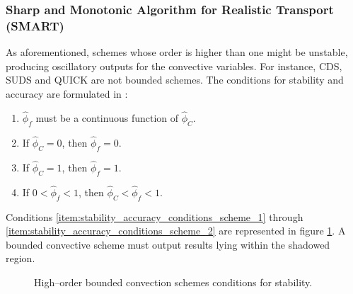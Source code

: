 \subsubsection{Sharp and Monotonic Algorithm for Realistic Transport (SMART)}

As aforementioned, schemes whose order is higher than one might be unstable,
producing oscillatory outputs for the convective variables. For instance, CDS,
SUDS and QUICK are not bounded schemes. The conditions for stability and
accuracy are formulated in \cite{gaskell1988curvature}:
\begin{enumerate}[label=(\roman*),topsep=0pt]
	\item $\hat{\phi}_f$ must be a continuous function of $\hat{\phi}_C$.
	\label{item:stability_accuracy_conditions_scheme_1}
	\item If $\hat{\phi}_C = 0$, then $\hat{\phi}_f = 0$.
	\item If $\hat{\phi}_C = 1$, then $\hat{\phi}_f = 1$.
	\item If $0 < \hat{\phi}_f < 1$, then $\hat{\phi}_C < \hat{\phi}_f <
	1$.\label{item:stability_accuracy_conditions_scheme_2}
\end{enumerate}
Conditions \ref{item:stability_accuracy_conditions_scheme_1} through
\ref{item:stability_accuracy_conditions_scheme_2} are represented in figure
\ref{fig:stability_accuracy_conditions_scheme}. A bounded convective scheme must
output results lying within the shadowed region.

\begin{figure}[ht]
	\centering
	\captionsetup{width=0.5\textwidth}
	\caption{High--order bounded convection schemes conditions for stability.}
	\label{fig:stability_accuracy_conditions_scheme}
\end{figure}

